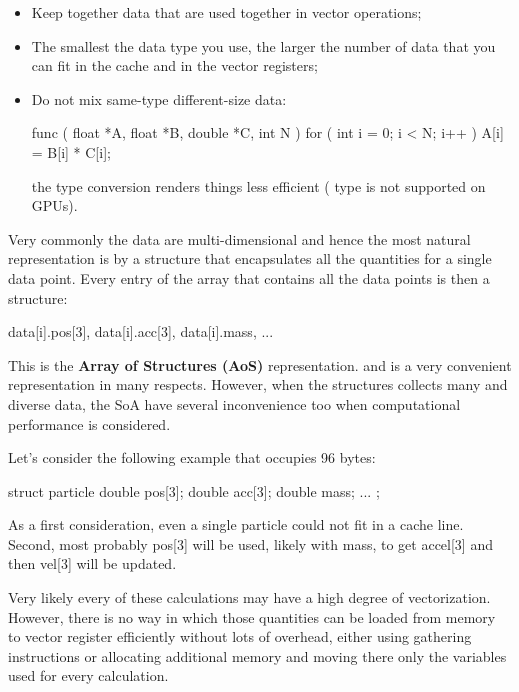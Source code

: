 \begin{tipsblock}
    \begin{itemize}
        \item Keep together data that are used together in vector operations;
        \item The smallest the data type you use, the larger the number of data that you can fit in the cache and in the vector registers;
        \item Do not mix same-type different-size data:
        \begin{codeblock}
func ( float *A, float *B, double *C, int N ) {
    for ( int i = 0; i < N; i++ ) {
        A[i] = B[i] * C[i];
    }
}
        \end{codeblock}
        the type conversion renders things less efficient ( type is not supported on GPUs).
    \end{itemize}
\end{tipsblock}

Very commonly the data are multi-dimensional and hence the most natural representation is by a structure that encapsulates all the quantities for a single data point. Every entry of the array that contains all the data points is then a structure:

\begin{codeblock}
data[i].pos[3], data[i].acc[3], data[i].mass, ...
\end{codeblock}

This is the \textbf{Array of Structures (AoS)} representation. and is a very convenient
representation in many respects. However, when the structures collects many and diverse data, the SoA have several inconvenience too when computational performance is considered.

Let's consider the following example that occupies 96 bytes:

\begin{codeblock}
    struct particle {
        double pos[3];
        double acc[3];
        double mass;
        ...
    };
\end{codeblock}

As a first consideration, even a single particle could not fit in a cache line. Second, most probably pos[3] will be used, likely with mass, to get accel[3] and then vel[3] will be updated.

Very likely every of these calculations may have a high degree of vectorization. However, there is no way in which those quantities can be loaded from memory to vector register efficiently without lots of overhead, either using gathering instructions or allocating additional memory and moving there only the variables used for every calculation.

